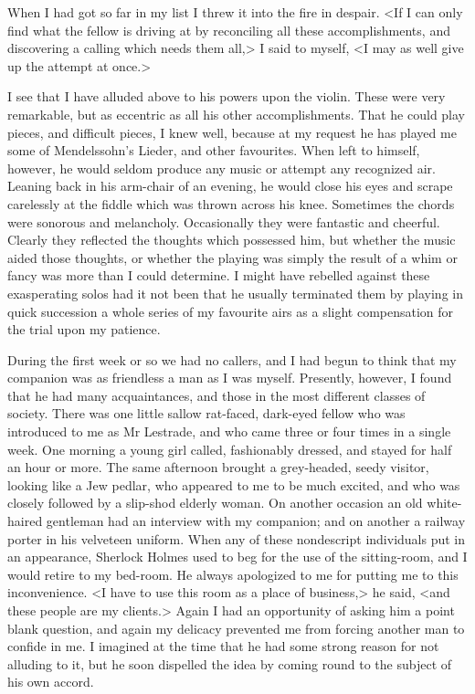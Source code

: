 When I had got so far in my list I threw it into the fire in despair. <If I can only find what the fellow is driving at by reconciling all these accomplishments, and discovering a calling which needs them all,> I said to myself, <I may as well give up the attempt at once.>

I see that I have alluded above to his powers upon the violin. These were very remarkable, but as eccentric as all his other accomplishments. That he could play pieces, and difficult pieces, I knew well, because at my request he has played me some of Mendelssohn's Lieder, and other favourites. When left to himself, however, he would seldom produce any music or attempt any recognized air. Leaning back in his arm-chair of an evening, he would close his eyes and scrape carelessly at the fiddle which was thrown across his knee. Sometimes the chords were sonorous and melancholy. Occasionally they were fantastic and cheerful. Clearly they reflected the thoughts which possessed him, but whether the music aided those thoughts, or whether the playing was simply the result of a whim or fancy was more than I could determine. I might have rebelled against these exasperating solos had it not been that he usually terminated them by playing in quick succession a whole series of my favourite airs as a slight compensation for the trial upon my patience.

During the first week or so we had no callers, and I had begun to think that my companion was as friendless a man as I was myself. Presently, however, I found that he had many acquaintances, and those in the most different classes of society. There was one little sallow rat-faced, dark-eyed fellow who was introduced to me as Mr Lestrade, and who came three or four times in a single week. One morning a young girl called, fashionably dressed, and stayed for half an hour or more. The same afternoon brought a grey-headed, seedy visitor, looking like a Jew pedlar, who appeared to me to be much excited, and who was closely followed by a slip-shod elderly woman. On another occasion an old white-haired gentleman had an interview with my companion; and on another a railway porter in his velveteen uniform. When any of these nondescript individuals put in an appearance, Sherlock Holmes used to beg for the use of the sitting-room, and I would retire to my bed-room. He always apologized to me for putting me to this inconvenience. <I have to use this room as a place of business,> he said, <and these people are my clients.> Again I had an opportunity of asking him a point blank question, and again my delicacy prevented me from forcing another man to confide in me. I imagined at the time that he had some strong reason for not alluding to it, but he soon dispelled the idea by coming round to the subject of his own accord.

